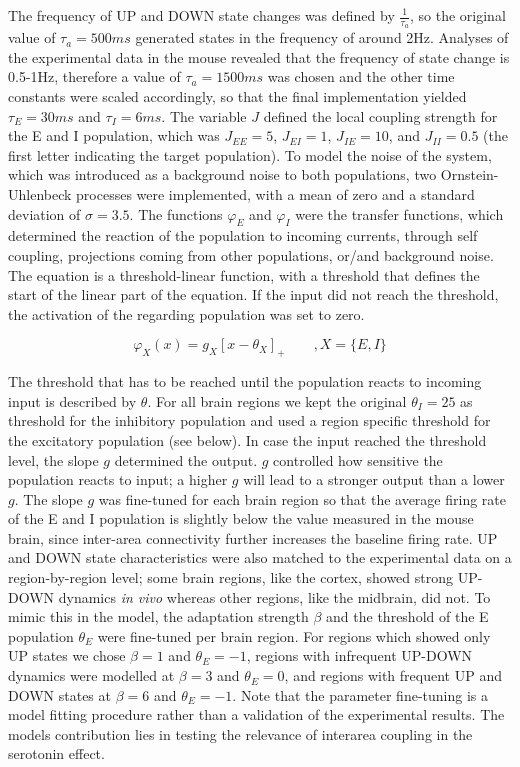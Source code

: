 \documentclass[11pt,a4paper,onecolumn]{article}
\begin{document}
\noindent
The frequency of UP and DOWN state changes was defined by $\frac{1}{\tau_a}$, so the original value of ${\tau_a=500ms}$ generated states in the frequency of around 2Hz. Analyses of the experimental data in the mouse revealed that the frequency of state change is 0.5-1Hz, therefore a value of $\tau_a=1500ms$ was chosen and the other time constants were scaled accordingly, so that the final implementation yielded $\tau_E=30ms$ and $\tau_I=6ms$. The variable $J$ defined the local coupling strength for the E and I population, which was $J_{EE} = 5$, $J_{EI} = 1$, $J_{IE} = 10$, and $J_{II} = 0.5$ (the first letter indicating the target population). To model the noise of the system, which was introduced as a background noise to both populations, two Ornstein-Uhlenbeck processes were implemented, with a mean of zero and a standard deviation of $\sigma=3.5$. The functions $\varphi_E$ and $\varphi_I$ were the transfer functions, which determined the reaction of the population to incoming currents, through self coupling, projections coming from other populations, or/and background noise. The equation is a threshold-linear function, with a threshold that defines the start of the linear part of the equation. If the input did not reach the threshold, the activation of the regarding population was set to zero. 

\begin{equation}\label{eq:4}
    \varphi_X(x) = g_X[x-\theta_X]_+\qquad,X=\{E,I\}
\end{equation}

\noindent
The threshold that has to be reached until the population reacts to incoming input is described by $\theta$. For all brain regions we kept the original $\theta_I = 25$ as threshold for the inhibitory population and used a region specific threshold for the excitatory population (see below). In case the input reached the threshold level, the slope $g$ determined the output. $g$ controlled how sensitive the population reacts to input; a higher $g$ will lead to a stronger output than a lower $g$. The slope $g$ was fine-tuned for each brain region so that the average firing rate of the E and I population is slightly below the value measured in the mouse brain, since inter-area connectivity further increases the baseline firing rate. UP and DOWN state characteristics were also matched to the experimental data on a region-by-region level; some brain regions, like the cortex, showed strong UP-DOWN dynamics \emph{in vivo} whereas other regions, like the midbrain, did not. To mimic this in the model, the adaptation strength $\beta$ and the threshold of the E population $\theta_E$ were fine-tuned per brain region. For regions which showed only UP states we chose $\beta = 1$ and $\theta_E = -1$, regions with infrequent UP-DOWN dynamics were modelled at $\beta = 3$ and $\theta_E = 0$, and regions with frequent UP and DOWN states at $\beta = 6$ and $\theta_E = -1$. Note that the parameter fine-tuning is a model fitting procedure rather than a validation of the experimental results. The models contribution lies in testing the relevance of interarea coupling in the serotonin effect. 
\end{document}
